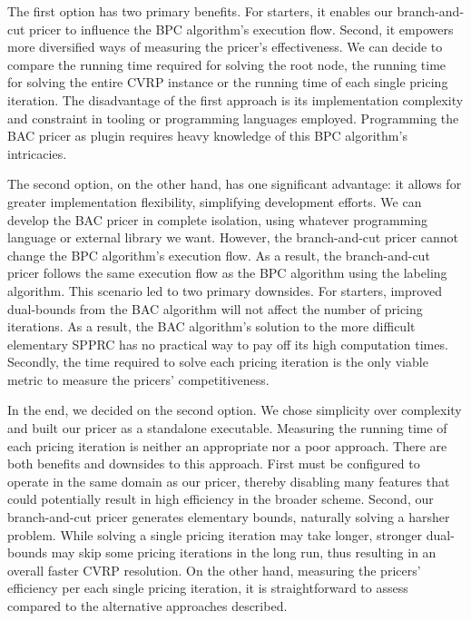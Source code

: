 The first option has two primary benefits.
For starters, it enables our branch-and-cut pricer to influence the BPC algorithm's execution flow.
Second, it empowers more diversified ways of measuring the pricer's effectiveness.
We can decide to compare
the running time required for solving the root node, the running time for solving the entire CVRP instance
or the running time of each single pricing iteration.
The disadvantage of the first approach is its implementation complexity
and constraint in tooling or programming languages employed.
Programming the BAC pricer as \bapcod{} plugin requires heavy knowledge of this BPC algorithm's intricacies.

The second option, on the other hand, has one significant advantage:
it allows for greater implementation flexibility, simplifying development efforts.
We can develop the BAC pricer in complete isolation,
using whatever programming language or external library we want.
However, the branch-and-cut pricer cannot change the BPC algorithm's execution flow.
As a result, the branch-and-cut pricer follows the same execution flow
as the BPC algorithm  using the labeling algorithm.
This scenario led to two primary downsides.
For starters, improved dual-bounds from the BAC algorithm
will not affect the number of pricing iterations.
As a result, the BAC algorithm's solution to the more difficult elementary SPPRC
has no practical way to pay off its high computation times.
Secondly, the time required to solve each pricing iteration
is the only viable metric to measure the pricers' competitiveness.

\medskip

In the end, we decided on the second option.
We chose simplicity over complexity and built our pricer as a standalone executable.
Measuring the running time of each pricing iteration is neither an appropriate nor a poor approach.
There are both benefits and downsides to this approach.
First \bapcod{} must be configured to operate in the same domain as our pricer,
thereby disabling many features that could potentially result in high efficiency in the broader scheme.
Second, our branch-and-cut pricer generates elementary bounds, naturally solving a harsher problem.
While solving a single pricing iteration may take longer,
stronger dual-bounds may skip some pricing iterations in the long run,
thus resulting in an overall faster CVRP resolution.
On the other hand, measuring the pricers' efficiency per each single pricing iteration,
it is straightforward to assess compared to the alternative approaches described.

